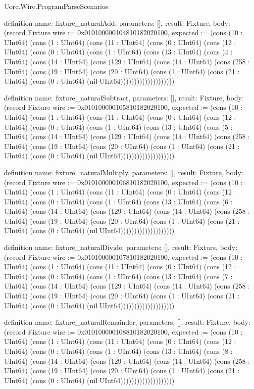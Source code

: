 \begin{lexlean}{Uorc.Wire.ProgramParseScenarios}
\begin{semanticmodule}
definition{
  name: fixture_naturalAdd,
  parameters: [],
  result: Fixture,
  body: (record Fixture {wire := 0x010100000104810182020100, expected := (cons (10 : UInt64) (cons (1 : UInt64) (cons (11 : UInt64) (cons (0 : UInt64) (cons (12 : UInt64) (cons (0 : UInt64) (cons (1 : UInt64) (cons (13 : UInt64) (cons (4 : UInt64) (cons (14 : UInt64) (cons (129 : UInt64) (cons (14 : UInt64) (cons (258 : UInt64) (cons (19 : UInt64) (cons (20 : UInt64) (cons (1 : UInt64) (cons (21 : UInt64) (cons (0 : UInt64) (nil UInt64)))))))))))))))))))})
}

definition{
  name: fixture_naturalSubtract,
  parameters: [],
  result: Fixture,
  body: (record Fixture {wire := 0x010100000105810182020100, expected := (cons (10 : UInt64) (cons (1 : UInt64) (cons (11 : UInt64) (cons (0 : UInt64) (cons (12 : UInt64) (cons (0 : UInt64) (cons (1 : UInt64) (cons (13 : UInt64) (cons (5 : UInt64) (cons (14 : UInt64) (cons (129 : UInt64) (cons (14 : UInt64) (cons (258 : UInt64) (cons (19 : UInt64) (cons (20 : UInt64) (cons (1 : UInt64) (cons (21 : UInt64) (cons (0 : UInt64) (nil UInt64)))))))))))))))))))})
}

definition{
  name: fixture_naturalMultiply,
  parameters: [],
  result: Fixture,
  body: (record Fixture {wire := 0x010100000106810182020100, expected := (cons (10 : UInt64) (cons (1 : UInt64) (cons (11 : UInt64) (cons (0 : UInt64) (cons (12 : UInt64) (cons (0 : UInt64) (cons (1 : UInt64) (cons (13 : UInt64) (cons (6 : UInt64) (cons (14 : UInt64) (cons (129 : UInt64) (cons (14 : UInt64) (cons (258 : UInt64) (cons (19 : UInt64) (cons (20 : UInt64) (cons (1 : UInt64) (cons (21 : UInt64) (cons (0 : UInt64) (nil UInt64)))))))))))))))))))})
}

definition{
  name: fixture_naturalDivide,
  parameters: [],
  result: Fixture,
  body: (record Fixture {wire := 0x010100000107810182020100, expected := (cons (10 : UInt64) (cons (1 : UInt64) (cons (11 : UInt64) (cons (0 : UInt64) (cons (12 : UInt64) (cons (0 : UInt64) (cons (1 : UInt64) (cons (13 : UInt64) (cons (7 : UInt64) (cons (14 : UInt64) (cons (129 : UInt64) (cons (14 : UInt64) (cons (258 : UInt64) (cons (19 : UInt64) (cons (20 : UInt64) (cons (1 : UInt64) (cons (21 : UInt64) (cons (0 : UInt64) (nil UInt64)))))))))))))))))))})
}

definition{
  name: fixture_naturalRemainder,
  parameters: [],
  result: Fixture,
  body: (record Fixture {wire := 0x010100000108810182020100, expected := (cons (10 : UInt64) (cons (1 : UInt64) (cons (11 : UInt64) (cons (0 : UInt64) (cons (12 : UInt64) (cons (0 : UInt64) (cons (1 : UInt64) (cons (13 : UInt64) (cons (8 : UInt64) (cons (14 : UInt64) (cons (129 : UInt64) (cons (14 : UInt64) (cons (258 : UInt64) (cons (19 : UInt64) (cons (20 : UInt64) (cons (1 : UInt64) (cons (21 : UInt64) (cons (0 : UInt64) (nil UInt64)))))))))))))))))))})
}


\end{semanticmodule}
\end{lexlean}
